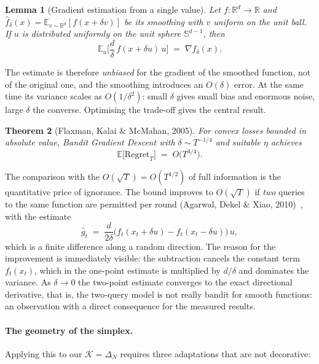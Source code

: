 \documentclass[12pt,a4paper,oneside]{report}
\renewcommand{\_}{\oldunderscore\allowbreak}
\theoremstyle{definition}
\theoremstyle{plain}
\newtheorem{theorem}{Theorem}[chapter]
\newtheorem{lemma}[theorem]{Lemma}
\theoremstyle{definition}   %
\begin{document}
\begin{lemma}[Gradient estimation from a single value]
\label{lem:one-point}
Let $f:\mathbb{R}^d \to \mathbb{R}$ and $\hat{f}_\delta(x) = \mathbb{E}_{v\sim \mathbb{B}^d}
[f(x+\delta v)]$ be its smoothing with $v$ uniform on the unit \emph{ball}. If $u$ is distributed
uniformly on the unit \emph{sphere} $\mathbb{S}^{d-1}$, then
\[
\mathbb{E}_u\Big[ \frac{d}{\delta}\, f(x + \delta u)\, u \Big] \;=\; \nabla \hat{f}_\delta(x).
\]
\end{lemma}

The estimate is therefore \emph{unbiased} for the gradient of the smoothed function, not of the
original one, and the smoothing introduces an $O(\delta)$ error. At the same time its variance
scales as $O(1/\delta^2)$: small $\delta$ gives small bias and enormous noise, large $\delta$ the
converse. Optimising the trade-off gives the central result.

\begin{theorem}[Flaxman, Kalai \& McMahan, 2005]
\label{thm:bgd}
For convex losses bounded in absolute value, Bandit Gradient Descent with
$\delta \sim T^{-1/4}$ and suitable $\eta$ achieves
\[
\mathbb{E}\big[\mathrm{Regret}_T\big] \;=\; O\big(T^{3/4}\big).
\]
\end{theorem}

The comparison with the $O(\sqrt{T}) = O(T^{1/2})$ of full information is the quantitative price
of ignorance. The bound improves to $O(\sqrt{T})$ if \emph{two} queries to the same function are
permitted per round (Agarwal, Dekel \& Xiao, 2010)~\cite{agarwal2010}, with the estimate
\[
\hat{g}_t \;=\; \frac{d}{2\delta}\big( f_t(x_t + \delta u) - f_t(x_t - \delta u) \big)\, u,
\]
which is a finite difference along a random direction. The reason for the improvement is
immediately visible: the subtraction cancels the constant term $f_t(x_t)$, which in the one-point
estimate is multiplied by $d/\delta$ and dominates the variance. As $\delta \to 0$ the two-point
estimate converges to the exact directional derivative, that is, the two-query model is not
really bandit for smooth functions: an observation with a direct consequence for the measured
results.

\paragraph{The geometry of the simplex.} Applying this to our $\mathcal{K}=\Delta_N$ requires
three adaptations that are not decorative:
\end{document}
